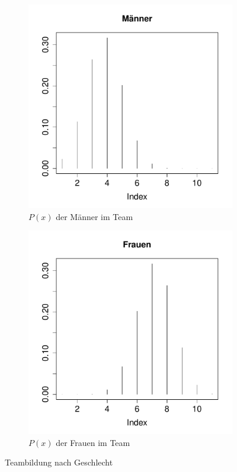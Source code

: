 \begin{figure}[h!]
\centering
\begin{subfigure}[b]{0.48\textwidth}
\includegraphics{verteilungen-012}
\caption{$P(x)$ der Männer im Team}
\end{subfigure}
\begin{subfigure}[b]{0.48\textwidth}
\centering
\includegraphics{verteilungen-013}
\caption{$P(x)$ der Frauen im Team}
\end{subfigure}
\caption{Teambildung nach Geschlecht}
\label{fig:team}
\end{figure}

